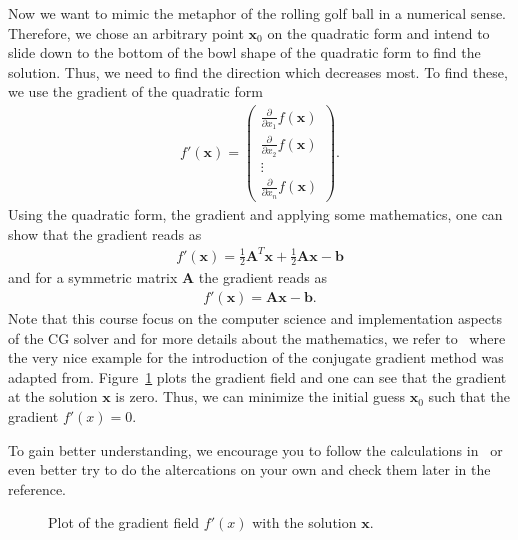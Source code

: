 Now we want to mimic the metaphor of the rolling golf ball in a numerical sense. Therefore, we chose an arbitrary point $\mathbf{x}_0$ on the quadratic form and intend to slide down to the bottom of the bowl shape of the quadratic form to find the solution. Thus, we need to find the direction which decreases most. To find these, we use the gradient of the quadratic form
\begin{align}
f'(\mathbf{x})=\begin{pmatrix}
\frac{\partial }{\partial x_1} f(\mathbf{x}) \\
\frac{\partial }{\partial x_2} f(\mathbf{x}) \\
\vdots \\
\frac{\partial }{\partial x_n} f(\mathbf{x})
\end{pmatrix}\text{.}
\end{align}
Using the quadratic form, the gradient and applying some mathematics, one can show that the gradient reads as
\begin{align}
f'(\mathbf{x}) = \frac{1}{2} \mathbf{A}^T \mathbf{x} + \frac{1}{2} \mathbf{A} \mathbf{x}-\mathbf{b}
\end{align}
and for a symmetric matrix $\mathbf{A}$ the gradient reads as
\begin{align}
f'(\mathbf{x})= \mathbf{A}\mathbf{x}-\mathbf{b}\text{.}
\end{align}
Note that this course focus on the computer science and implementation aspects of the CG solver and for more details about the mathematics, we refer to~\cite{shewchuk1994introduction} where the very nice example for the introduction of the conjugate gradient method was adapted from. Figure~\ref{fig:gradient:field} plots the gradient field and one can see that the gradient at the solution $\mathbf{x}$ is zero. Thus, we can minimize the initial guess $\mathbf{x}_0$ such that the gradient $f'(x)=0$.\\

\begin{exercise}
To gain better understanding, we encourage you to follow the calculations in~\cite{shewchuk1994introduction} or even better try to do the altercations on your own and check them later in the reference.
\end{exercise}

\begin{figure}[tb]
\centering
{}
\caption{Plot of the gradient field  $f'(x)$ with the solution $\mathbf{x}$. }
\label{fig:gradient:field}
\end{figure}

